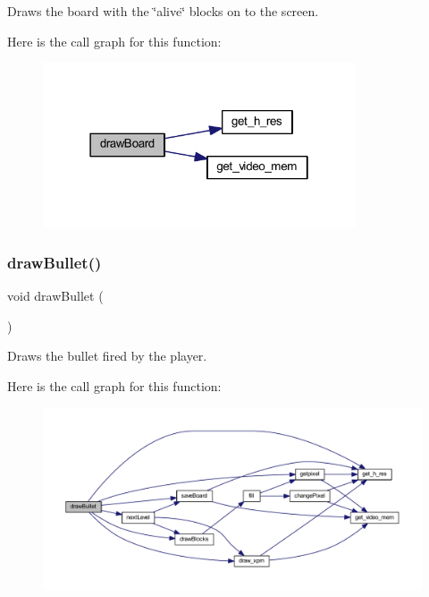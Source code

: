 Draws the board with the \char`\"{}alive\char`\"{} blocks on to the screen. 

Here is the call graph for this function\+:
\nopagebreak
\begin{figure}[H]
\begin{center}
\leavevmode
\includegraphics[width=262pt]{group__game_ga435ba4a0d4fc47fbf7b4e13acaa312e4_cgraph}
\end{center}
\end{figure}
\mbox{\label{group__game_ga43d711f5646009700e97e8cce499d5fc}} 
\subsubsection{\texorpdfstring{drawBullet()}{drawBullet()}}
{\footnotesize\ttfamily void draw\+Bullet (\begin{DoxyParamCaption}{ }\end{DoxyParamCaption})}



Draws the bullet fired by the player. 

Here is the call graph for this function\+:
\nopagebreak
\begin{figure}[H]
\begin{center}
\leavevmode
\includegraphics[width=350pt]{group__game_ga43d711f5646009700e97e8cce499d5fc_cgraph}
\end{center}
\end{figure}
\mbox{\label{group__game_ga072809b49225566117672a2ec734b2cc}} 
